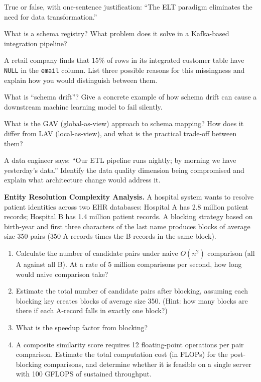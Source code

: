 \sq True or false, with one-sentence justification: ``The ELT paradigm
eliminates the need for data transformation.''

\sq What is a schema registry? What problem does it solve in a
Kafka-based integration pipeline?

\sq A retail company finds that 15\% of rows in its integrated customer
table have \texttt{NULL} in the \texttt{email} column. List three
possible reasons for this missingness and explain how you would
distinguish between them.

\sq What is ``schema drift''? Give a concrete example of how schema
drift can cause a downstream machine learning model to fail silently.

\sq What is the GAV (global-as-view) approach to schema mapping? How
does it differ from LAV (local-as-view), and what is the practical
trade-off between them?

\sq A data engineer says: ``Our ETL pipeline runs nightly; by morning
we have yesterday's data.'' Identify the data quality dimension being
compromised and explain what architecture change would address it.

\bigskip
{}

\ap \textbf{Entity Resolution Complexity Analysis.}
A hospital system wants to resolve patient identities across two EHR
databases: Hospital A has 2.8 million patient records; Hospital B has
1.4 million patient records. A blocking strategy based on birth-year
and first three characters of the last name produces blocks of average
size 350 pairs (350 A-records times the B-records in the same block).

\begin{enumerate}[label=(\alph*)]
  \item Calculate the number of candidate pairs under naive $O(n^2)$
        comparison (all A against all B). At a rate of 5 million
        comparisons per second, how long would naive comparison take?
  \item Estimate the total number of candidate pairs after blocking,
        assuming each blocking key creates blocks of average size 350.
        (Hint: how many blocks are there if each A-record falls in
        exactly one block?)
  \item What is the speedup factor from blocking?
  \item A composite similarity score requires 12 floating-point
        operations per pair comparison. Estimate the total computation
        cost (in FLOPs) for the post-blocking comparisons, and determine
        whether it is feasible on a single server with 100 GFLOPS of
        sustained throughput.
\end{enumerate}

